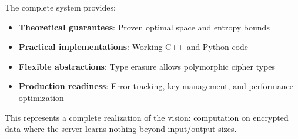 The complete system provides:
\begin{itemize}
\item \textbf{Theoretical guarantees}: Proven optimal space and entropy bounds
\item \textbf{Practical implementations}: Working C++ and Python code
\item \textbf{Flexible abstractions}: Type erasure allows polymorphic cipher types
\item \textbf{Production readiness}: Error tracking, key management, and performance optimization
\end{itemize}

This represents a complete realization of the vision: computation on encrypted data where the server learns nothing beyond input/output sizes.